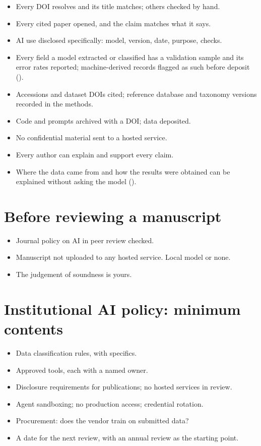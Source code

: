 \begin{itemize}[label=$\square$]
  \item Every DOI resolves and its title matches; others checked by hand.
  \item Every cited paper opened, and the claim matches what it says.
  \item AI use disclosed specifically: model, version, date, purpose, checks.
  \item Every field a model extracted or classified has a validation sample
    and its error rates reported; machine-derived records flagged as such
    before deposit ().
  \item Accessions and dataset DOIs cited; reference database and taxonomy
    versions recorded in the methods.
  \item Code and prompts archived with a DOI; data deposited.
  \item No confidential material sent to a hosted service.
  \item Every author can explain and support every claim.
  \item Where the data came from and how the results were obtained can be
    explained without asking the model ().
\end{itemize}

\section{Before reviewing a manuscript}

\begin{itemize}[label=$\square$]
  \item Journal policy on AI in peer review checked.
  \item Manuscript not uploaded to any hosted service. Local model or none.
  \item The judgement of soundness is yours.
\end{itemize}

\section{Institutional AI policy: minimum contents}

\begin{itemize}[label=$\square$]
  \item Data classification rules, with specifics.
  \item Approved tools, each with a named owner.
  \item Disclosure requirements for publications; no hosted services in review.
  \item Agent sandboxing; no production access; credential rotation.
  \item Procurement: does the vendor train on submitted data?
  \item A date for the next review, with an annual review as the starting point.
\end{itemize}
